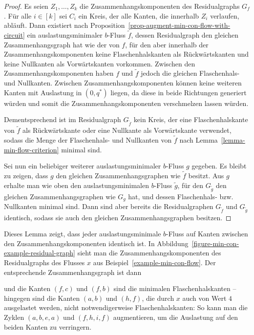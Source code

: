 \begin{proof}
	Es seien $Z_1,\dots, Z_k$ die Zusammenhangskomponenten des Residualgraphs $G_f$.
	Für alle $i\in [k]$ sei $C_i$ ein Kreis, der alle Kanten, die innerhalb $Z_i$ verlaufen, abläuft.
	Dann existiert nach Proposition~\ref{prop-augment-min-con-flow-with-circuit} ein auslastungsminimaler $b$-Fluss $\tilde{f}$, dessen Residualgraph den gleichen Zusammenhangsgraph hat wie der von $f$, für den aber innerhalb der Zusammenhangskomponenten keine Flaschenhalskanten als Rückwärtskanten und keine Nullkanten als Vorwärtskanten vorkommen.
	Zwischen den Zusammenhangskomponenten haben $f$ und $\tilde{f}$ jedoch die gleichen Flaschenhals- und Nullkanten.
	Zwischen Zusammenhangskomponenten können keine weiteren Kanten mit Auslastung in $(0, q^*)$ liegen, da diese in beide Richtungen generiert würden und somit die Zusammenhangskomponenten verschmelzen lassen würden.
	
	Dementsprechend ist im Residualgraph $G_{\tilde{f}}$ kein Kreis, der eine Flaschenhalskante von $\tilde{f}$ als Rückwärtskante oder eine Nullkante als Vorwärtskante verwendet, sodass die Menge der Flaschenhals- und Nullkanten von $\tilde{f}$ nach Lemma~\ref{lemma-min-flow-criterion} minimal sind.
	
	Sei nun ein beliebiger weiterer auslastungsminimaler $b$-Fluss $g$ gegeben.
	Es bleibt zu zeigen, dass $g$ den gleichen Zusammenhangsgraphen wie $\tilde{f}$ besitzt.
	Aus $g$ erhalte man wie oben den auslastungsminimalen $b$-Fluss $\tilde{g}$, für den $G_{\tilde{g}}$ den gleichen Zusammenhangsgraphen wie $G_g$ hat, und dessen Flaschenhals- bzw. Nullkanten minimal sind.
	Dann sind aber bereits die Residualgraphen $G_{\tilde{f}}$ und $G_{\tilde{g}}$ identisch, sodass sie auch den gleichen Zusammenhangsgraphen besitzen.
\end{proof}


Dieses Lemma zeigt, dass jeder auslastungsminimale $b$-Fluss auf Kanten zwischen den Zusammenhangskomponenten identisch ist.
In Abbildung~\ref{figure-min-con-example-residual-graph} sieht man die Zusammenhangskomponenten des Residualgraphs des Flusses $x$ aus Beispiel~\ref{example-min-con-flow}.
Der entsprechende Zusammenhangsgraph ist dann
\begin{center}
\end{center}
und die Kanten $(f,c)$ und $(f,b)$ sind die minimalen Flaschenhalskanten -- hingegen sind die Kanten $(a,b)$ und $(h,f)$, die durch $x$ auch von Wert $4$ ausgelastet werden, nicht notwendigerweise Flaschenhalskanten: So kann man die Zyklen $(a,b,e,a)$ und $(f,h,i,f)$ augmentieren, um die Auslastung auf den beiden Kanten zu verringern.

